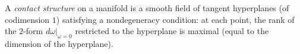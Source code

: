 A \textit{contact structure} on a manifold is a smooth field of tangent hyperplanes (of codimension $1$) satisfying a nondegeneracy condition: at each point, the rank of the $2$-form $d\omega|_{\omega=0}$ restricted to the hyperplane is maximal (equal to the dimension of the hyperplane).
